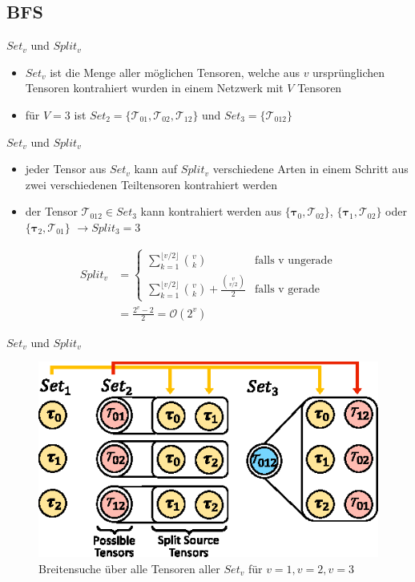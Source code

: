 \documentclass{beamer}
\newcommand{\Tau}{\bm{\mathcal{T}}}
\newcommand{\tauB}{\bm{\tau}}
\begin{document}
\subsection{BFS}

\begin{frame}{$Set_v$ und $Split_v$}
	\begin{itemize}
		\item $Set_v$ ist die Menge aller möglichen Tensoren, welche aus $v$ ursprünglichen Tensoren kontrahiert wurden in einem Netzwerk mit $V$ Tensoren
		\item für $V = 3$ ist $Set_2 = \{\Tau_{01}, \Tau_{02}, \Tau_{12} \}$ und $Set_3 = \{\Tau_{012} \}$
	\end{itemize}
\end{frame}

\begin{frame}{$Set_v$ und $Split_v$}
	\begin{itemize}
		\item jeder Tensor aus $Set_v$ kann auf $Split_v$ verschiedene Arten in einem Schritt aus zwei verschiedenen Teiltensoren kontrahiert werden
		\item der Tensor $\Tau_{012} \in Set_3$ kann kontrahiert werden aus $\{\tauB_0, \Tau_{02} \}$, $\{\tauB_{1}, \Tau_{02} \}$ oder $\{\tauB_{2}, \Tau_{01} \}$ $\rightarrow Split_3 = 3$
	\end{itemize}
	\begin{align*}
		Split_v & = \begin{cases}
			            \sum^{\lfloor v/2 \rfloor}_{k=1} \binom{v}{k}                            & \text{falls v ungerade} \\
			            \sum^{\lfloor v/2 \rfloor}_{k=1} \binom{v}{k} + \frac{\binom{v}{v/2}}{2} & \text{falls v gerade}
		            \end{cases} \\
		        & = \frac{2^v - 2}{2} = \mathcal{O}(2^v)
	\end{align*}
\end{frame}

\begin{frame}{$Set_v$ und $Split_v$}
	\begin{figure}
		\includegraphics{figure_04}
		\caption*{Breitensuche über alle Tensoren aller $Set_v$ für $v=1, v=2, v=3$}
	\end{figure}
\end{frame}
\end{document}

